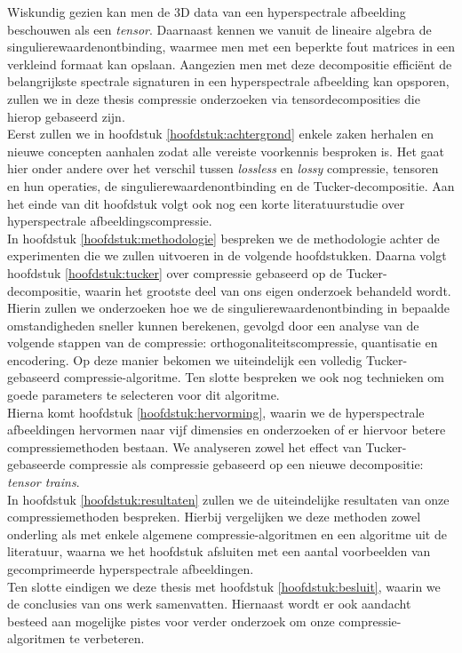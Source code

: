 Wiskundig gezien kan men de 3D data van een hyperspectrale afbeelding beschouwen als een \textit{tensor}. Daarnaast kennen we vanuit de lineaire algebra de singulierewaardenontbinding, waarmee men met een beperkte fout matrices in een verkleind formaat kan opslaan. Aangezien men met deze decompositie effici\"ent de belangrijkste spectrale signaturen in een hyperspectrale afbeelding kan opsporen, zullen we in deze thesis compressie onderzoeken via tensordecomposities die hierop gebaseerd zijn.\\

Eerst zullen we in hoofdstuk \ref{hoofdstuk:achtergrond} enkele zaken herhalen en nieuwe concepten aanhalen zodat alle vereiste voorkennis besproken is. Het gaat hier onder andere over het verschil tussen \textit{lossless} en \textit{lossy} compressie, tensoren en hun operaties, de singulierewaardenontbinding en de Tucker-decompositie. Aan het einde van dit hoofdstuk volgt ook nog een korte literatuurstudie over hyperspectrale afbeeldingscompressie.\\

In hoofdstuk \ref{hoofdstuk:methodologie} bespreken we de methodologie achter de experimenten die we zullen uitvoeren in de volgende hoofdstukken. Daarna volgt hoofdstuk \ref{hoofdstuk:tucker} over compressie gebaseerd op de Tucker-decompositie, waarin het grootste deel van ons eigen onderzoek behandeld wordt. Hierin zullen we onderzoeken hoe we de singulierewaardenontbinding in bepaalde omstandigheden sneller kunnen berekenen, gevolgd door een analyse van de volgende stappen van de compressie: orthogonaliteitscompressie, quantisatie en encodering. Op deze manier bekomen we uiteindelijk een volledig Tucker-gebaseerd compressie-algoritme. Ten slotte bespreken we ook nog technieken om goede parameters te selecteren voor dit algoritme.\\

Hierna komt hoofdstuk \ref{hoofdstuk:hervorming}, waarin we de hyperspectrale afbeeldingen hervormen naar vijf dimensies en onderzoeken of er hiervoor betere compressiemethoden bestaan. We analyseren zowel het effect van Tucker-gebaseerde compressie als compressie gebaseerd op een nieuwe decompositie: \textit{tensor trains}.\\

In hoofdstuk \ref{hoofdstuk:resultaten} zullen we de uiteindelijke resultaten van onze compressiemethoden bespreken. Hierbij vergelijken we deze methoden zowel onderling als met enkele algemene compressie-algoritmen en een algoritme uit de literatuur, waarna we het hoofdstuk afsluiten met een aantal voorbeelden van gecomprimeerde hyperspectrale afbeeldingen.\\

Ten slotte eindigen we deze thesis met hoofdstuk \ref{hoofdstuk:besluit}, waarin we de conclusies van ons werk samenvatten. Hiernaast wordt er ook aandacht besteed aan mogelijke pistes voor verder onderzoek om onze compressie-algoritmen te verbeteren.